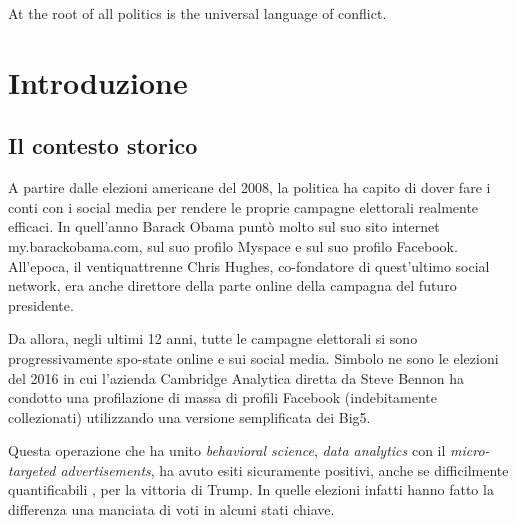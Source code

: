\begin{savequote}[75mm]
	At the root of all politics is the universal language of conflict.
\end{savequote}


\chapter{Introduzione}
\label{chap:introduzione}

\section{Il contesto storico}
A partire dalle elezioni americane del 2008, la politica ha capito di dover fare i conti con i social media per rendere le proprie campagne elettorali realmente efficaci. In quell'anno Barack Obama puntò molto sul suo sito internet my.barackobama.com, sul suo profilo    Myspace e sul suo profilo Facebook. All'epoca, il ventiquattrenne Chris Hughes, co-fondatore di quest'ultimo social network, era anche direttore della parte online della campagna del futuro presidente.

Da allora, negli ultimi 12 anni, tutte le campagne elettorali si sono progressivamente spo-state online e sui social media.
Simbolo ne sono le elezioni del 2016 in cui l'azienda Cambridge Analytica diretta da Steve Bennon ha condotto una profilazione di massa di profili Facebook (indebitamente collezionati) utilizzando una versione semplificata dei Big5.

Questa operazione che ha unito \textit{behavioral science}, \textit{data analytics} con il \textit{micro-targeted advertisements}, ha avuto esiti sicuramente positivi, anche se difficilmente quantificabili \citep{rathi2019}, per la vittoria di Trump. In quelle elezioni infatti hanno fatto la differenza una manciata di voti in alcuni stati chiave.

